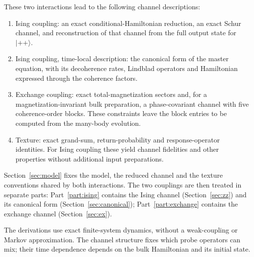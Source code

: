 \documentclass[11pt,a4paper]{article}
\newcommand{\ket}[1]{\lvert #1\rangle}
\begin{document}
These two interactions lead to the following channel descriptions:
\begin{enumerate}
\item Ising coupling: an exact conditional-Hamiltonian reduction, an exact
Schur channel, and reconstruction of that channel from the full output
state for $\ket{++}$.
\item Ising coupling, time-local description: the canonical form of the
master equation, with its decoherence rates, Lindblad operators and
Hamiltonian expressed through the coherence factors.
\item Exchange coupling: exact total-magnetization sectors and, for a
magnetization-invariant bulk preparation, a phase-covariant channel with
five coherence-order blocks. These constraints leave the block entries
to be computed from the many-body evolution.
\item Texture: exact grand-sum, return-probability and response-operator
identities. For Ising coupling these yield channel fidelities and other
properties without additional input preparations.
\end{enumerate}

Section~\ref{sec:model} fixes the model, the reduced channel and the
texture conventions shared by both interactions. The two couplings are
then treated in separate parts: Part~\ref{part:ising} contains the Ising
channel (Section~\ref{sec:zz}) and its canonical form
(Section~\ref{sec:canonical}); Part~\ref{part:exchange} contains the
exchange channel (Section~\ref{sec:ex}).

The derivations use exact finite-system dynamics, without a weak-coupling
or Markov approximation. The channel structure fixes which probe
operators can mix; their time dependence depends on the bulk Hamiltonian
and its initial state.
\end{document}
